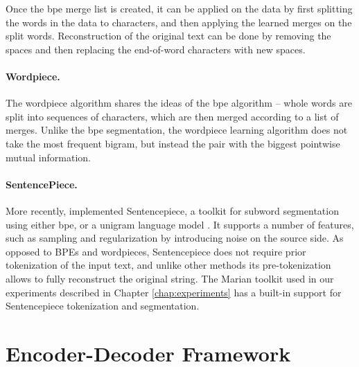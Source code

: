 Once the \ac{bpe} merge list is created, it can be applied on the data by first
splitting the words in the data to characters, and then applying the learned
merges on the split words. Reconstruction of the original text can be done by
removing the spaces and then replacing the end-of-word characters with new
spaces.

\paragraph{Wordpiece.} The wordpiece algorithm
\citep{schuster-nakajima-2012-japanese,wu2016google} shares the ideas of the
\ac{bpe} algorithm -- whole words are split into sequences of characters, which
are then merged according to a list of merges. Unlike the \ac{bpe}
segmentation, the wordpiece learning algorithm does not take the most frequent
bigram, but instead the pair with the biggest pointwise mutual
information. 


\paragraph{SentencePiece.} More recently,
\citet{kudo-richardson-2018-sentencepiece} implemented Sentencepiece, a toolkit
for subword segmentation using either \ac{bpe}, or a unigram language model
\citep{kudo-2018-subword}. It supports a number of features, such as sampling
and regularization by introducing noise on the source side. As opposed to BPEs
and wordpieces, Sentencepiece does not require prior tokenization of the input
text, and unlike other methods its pre-tokenization allows to fully reconstruct
the original string. The Marian toolkit
\citep{junczys-dowmunt-etal-2018-marian} used in our experiments described in
Chapter \ref{chap:experiments} has a built-in support for Sentencepiece
tokenization and segmentation.

\section{Encoder-Decoder Framework}
\label{sec:encdec}


